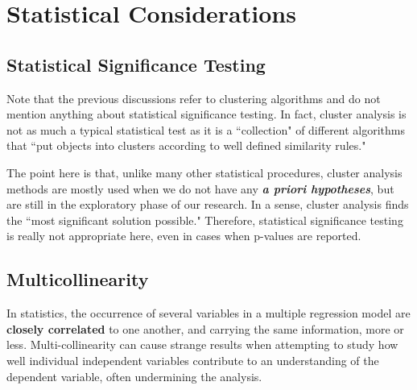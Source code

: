 \documentclass[RCluster.tex]{subfiles}
\begin{document}
\section{Statistical Considerations}
\subsection{Statistical Significance Testing}

Note that the previous discussions refer to clustering algorithms and do not mention anything about statistical significance testing. In fact, cluster analysis is not as much a typical statistical test as it is a ``collection" of different algorithms that ``put objects into clusters according to well defined similarity rules."

The point here is that, unlike many other statistical procedures, cluster analysis methods are mostly used when we do not have any \textbf{\textit{a priori hypotheses}}, but are still in the exploratory phase of our research. In a sense, cluster analysis finds the ``most significant solution possible." Therefore, statistical significance testing is really not appropriate here, even in cases when p-values are reported.

\subsection{Multicollinearity}
In statistics, the occurrence of several  variables in a multiple regression model are \textbf{closely correlated} to one another, and carrying the same information, more or less. Multi-collinearity can cause strange results when attempting to study how well individual independent variables contribute to an understanding of the dependent variable, often undermining the analysis.
\end{document}
